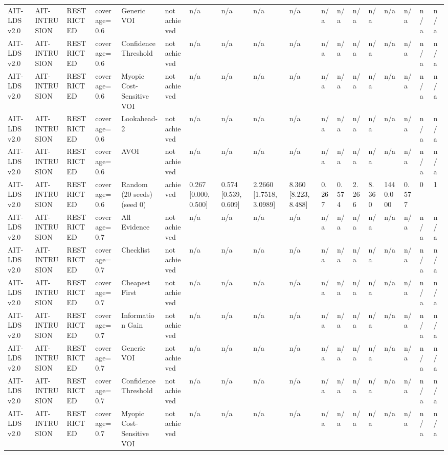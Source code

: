 \begin{table}[!ht]
{\begin{tabular}{llllllllllllllllll}
AIT-LDS v2.0 & AIT-INTRUSION & RESTRICTED & coverage=0.6 & Generic VOI & not achieved & n/a & n/a & n/a & n/a & n/a & n/a & n/a & n/a & n/a & n/a & n/a & n/a \\
AIT-LDS v2.0 & AIT-INTRUSION & RESTRICTED & coverage=0.6 & Confidence Threshold & not achieved & n/a & n/a & n/a & n/a & n/a & n/a & n/a & n/a & n/a & n/a & n/a & n/a \\
AIT-LDS v2.0 & AIT-INTRUSION & RESTRICTED & coverage=0.6 & Myopic Cost-Sensitive VOI & not achieved & n/a & n/a & n/a & n/a & n/a & n/a & n/a & n/a & n/a & n/a & n/a & n/a \\
AIT-LDS v2.0 & AIT-INTRUSION & RESTRICTED & coverage=0.6 & Lookahead-2 & not achieved & n/a & n/a & n/a & n/a & n/a & n/a & n/a & n/a & n/a & n/a & n/a & n/a \\
AIT-LDS v2.0 & AIT-INTRUSION & RESTRICTED & coverage=0.6 & AVOI & not achieved & n/a & n/a & n/a & n/a & n/a & n/a & n/a & n/a & n/a & n/a & n/a & n/a \\
AIT-LDS v2.0 & AIT-INTRUSION & RESTRICTED & coverage=0.6 & Random (20 seeds) (seed 0) & achieved & 0.267 [0.000, 0.500] & 0.574 [0.539, 0.609] & 2.2660 [1.7518, 3.0989] & 8.360 [8.223, 8.488] & 0.267 & 0.574 & 2.266 & 8.360 & 1440.000 & 0.577 & 0 & 1 \\
AIT-LDS v2.0 & AIT-INTRUSION & RESTRICTED & coverage=0.7 & All Evidence & not achieved & n/a & n/a & n/a & n/a & n/a & n/a & n/a & n/a & n/a & n/a & n/a & n/a \\
AIT-LDS v2.0 & AIT-INTRUSION & RESTRICTED & coverage=0.7 & Checklist & not achieved & n/a & n/a & n/a & n/a & n/a & n/a & n/a & n/a & n/a & n/a & n/a & n/a \\
AIT-LDS v2.0 & AIT-INTRUSION & RESTRICTED & coverage=0.7 & Cheapest First & not achieved & n/a & n/a & n/a & n/a & n/a & n/a & n/a & n/a & n/a & n/a & n/a & n/a \\
AIT-LDS v2.0 & AIT-INTRUSION & RESTRICTED & coverage=0.7 & Information Gain & not achieved & n/a & n/a & n/a & n/a & n/a & n/a & n/a & n/a & n/a & n/a & n/a & n/a \\
AIT-LDS v2.0 & AIT-INTRUSION & RESTRICTED & coverage=0.7 & Generic VOI & not achieved & n/a & n/a & n/a & n/a & n/a & n/a & n/a & n/a & n/a & n/a & n/a & n/a \\
AIT-LDS v2.0 & AIT-INTRUSION & RESTRICTED & coverage=0.7 & Confidence Threshold & not achieved & n/a & n/a & n/a & n/a & n/a & n/a & n/a & n/a & n/a & n/a & n/a & n/a \\
AIT-LDS v2.0 & AIT-INTRUSION & RESTRICTED & coverage=0.7 & Myopic Cost-Sensitive VOI & not achieved & n/a & n/a & n/a & n/a & n/a & n/a & n/a & n/a & n/a & n/a & n/a & n/a \\

\end{tabular}}
\end{table}
